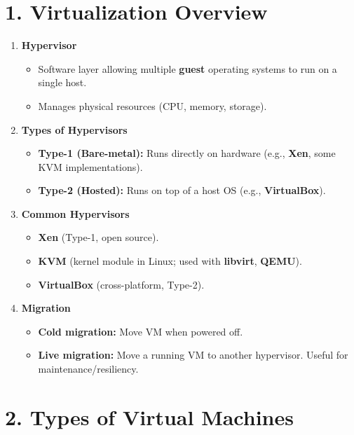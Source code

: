 \documentclass[a4paper]{report}
\begin{document}
\section*{1. Virtualization Overview}

\begin{enumerate}
    \item \textbf{Hypervisor}
    \begin{itemize}
        \item Software layer allowing multiple \textbf{guest} operating systems to run on a single host.
        \item Manages physical resources (CPU, memory, storage).
    \end{itemize}

    \item \textbf{Types of Hypervisors}
    \begin{itemize}
        \item \textbf{Type-1 (Bare-metal):} Runs directly on hardware (e.g., \textbf{Xen}, some KVM implementations).
        \item \textbf{Type-2 (Hosted):} Runs on top of a host OS (e.g., \textbf{VirtualBox}).
    \end{itemize}

    \item \textbf{Common Hypervisors}
    \begin{itemize}
        \item \textbf{Xen} (Type-1, open source).
        \item \textbf{KVM} (kernel module in Linux; used with \textbf{libvirt}, \textbf{QEMU}).
        \item \textbf{VirtualBox} (cross-platform, Type-2).
    \end{itemize}

    \item \textbf{Migration}
    \begin{itemize}
        \item \textbf{Cold migration:} Move VM when powered off.
        \item \textbf{Live migration:} Move a running VM to another hypervisor. Useful for maintenance/resiliency.
    \end{itemize}
\end{enumerate}

\section*{2. Types of Virtual Machines}
\end{document}
